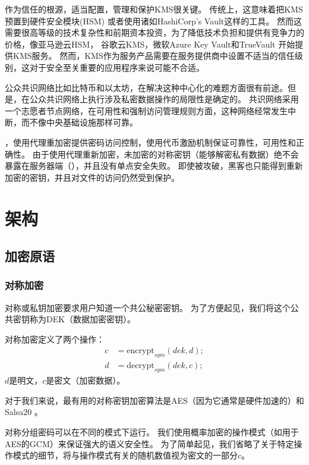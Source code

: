 \documentclass[longbibliography,nofootinbib]{revtex4-1}
\newcommand{\kms}{NuCypher KMS}
\begin{document}
\begin{CJK*}{UTF8}{gbsn}
作为信任的根源，适当配置，管理和保护KMS很关键。
传统上，这意味着把KMS预置到硬件安全模块(HSM)\cite{wiki:hsm} 或者使用诸如HashiCorp’s Vault\cite{web:hashicorp-vault}这样的工具。
然而这需要很高等级的技术复杂性和前期资本投资，为了降低技术负担和提供有竞争力的价格，像亚马逊云HSM\cite{web:aws-cloudhsm}，
谷歌云KMS\cite{web:google-cloud-kms}，微软Azure Key Vault\cite{web:azure-key-vault}和TrueVault\cite{web:truevault} 开始提供KMS服务。
然而，KMS作为服务产品需要在服务提供商中设置不适当的信任级别，这对于安全至关重要的应用程序来说可能不合适。

公众共识网络比如比特币和以太坊，在解决这种中心化的难题方面很有前途。但是，在公众共识网络上执行涉及私密数据操作的局限性是确定的\cite{cryptoeprint:2017:201}。
共识网络采用一个志愿者节点网络，在可用性和强制访问管理规则方面，这种网络经常发生中断，而不像中央基础设施那样可靠。

，使用代理重加密提供密码访问控制，使用代币激励机制保证可靠性，可用性和正确性。
由于使用代理重新加密，未加密的对称密钥（能够解密私有数据）绝不会暴露在服务器端（），并且没有单点安全失败。
即使被攻破，黑客也只能得到重新加密的密钥，并且对文件的访问仍然受到保护。

\section{架构}

\subsection{加密原语}

\subsubsection{对称加密}

对称或私钥加密要求用户知道一个共公秘密密钥。
为了方便起见，我们将这个公共密钥称为DEK（数据加密密钥）。

对称加密定义了两个操作：
\begin{align}
    c &= \text{encrypt}_{sym}(dek, d);\\
    d &= \text{decrypt}_{sym}(dek, c);
\end{align}
$d$是明文，$c$是密文（加密数据）。

对于我们来说，最有用的对称密钥加密算法是AES（因为它通常是硬件加速的）\cite{wiki:aes}和Salsa20 \cite{wiki:salsa20}。

对称分组密码可以在不同的模式下运行。
我们使用概率加密的操作模式（如用于AES的GCM）来保证强大的语义安全性。
为了简单起见，我们省略了关于特定操作模式的细节，将与操作模式有关的随机数值视为密文的一部分$c$。


\end{CJK*}
\end{document}
